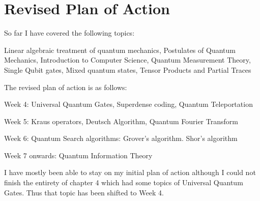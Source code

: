 \section{Revised Plan of Action}

So far I have covered the following topics:

Linear algebraic treatment of quantum mechanics, Postulates of Quantum Mechanics, Introduction to Computer Science, Quantum Measurement Theory,  Single Qubit gates, Mixed quantum states, Tensor Products and Partial Traces


The revised plan of action is as follows:

Week 4: Universal Quantum Gates, Superdense coding, Quantum Teleportation

Week 5: Kraus operators, Deutsch Algorithm, Quantum Fourier Transform

Week 6: Quantum Search algorithms: Grover’s algorithm. Shor’s algorithm

Week 7 onwards: Quantum Information Theory

I have mostly been able to stay on my initial plan of action although I could not finish the entirety of chapter 4 which had some topics of Universal Quantum Gates. Thus that topic has been shifted to Week 4.